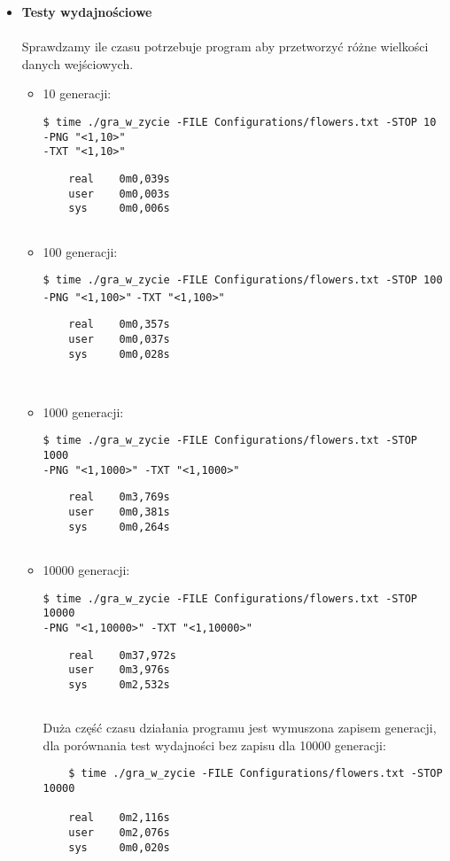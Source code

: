 \documentclass[12pt,a4paper,notitlepage]{report}
\begin{document}
\begin{itemize}
{\begin{verbatim}
\end{verbatim}}

\item\large\textbf {Testy wydajnościowe}\\
\\
Sprawdzamy ile czasu potrzebuje program aby przetworzyć różne wielkości danych wejściowych.
\begin{itemize}
	\item 10 generacji:
	
	\small\verb|$ time ./gra_w_zycie -FILE Configurations/flowers.txt -STOP 10 -PNG "<1,10>"|\\
	\verb|-TXT "<1,10>"|
	\begin{verbatim}
	real    0m0,039s
	user    0m0,003s
	sys     0m0,006s
	
	\end{verbatim}
	
	\large\item 100 generacji:
	
	\small\verb|$ time ./gra_w_zycie -FILE Configurations/flowers.txt -STOP 100 -PNG "<1,100>"|
	\verb|-TXT "<1,100>"|
	\begin{verbatim}
	real    0m0,357s
	user    0m0,037s
	sys     0m0,028s
	
	
	\end{verbatim}
	
	\large\item 1000 generacji:
	
	\small\verb|$ time ./gra_w_zycie -FILE Configurations/flowers.txt -STOP 1000|\\
	\verb|-PNG "<1,1000>" -TXT "<1,1000>"|
	\begin{verbatim}
	real    0m3,769s
	user    0m0,381s
	sys     0m0,264s
	
	\end{verbatim}
	
	\large\item 10000 generacji:
	
	\small\verb|$ time ./gra_w_zycie -FILE Configurations/flowers.txt -STOP 10000|\\
	\verb|-PNG "<1,10000>" -TXT "<1,10000>"|
	\begin{verbatim}
	real    0m37,972s
	user    0m3,976s
	sys     0m2,532s
	
	\end{verbatim}
	
	\large Duża część czasu działania programu jest wymuszona zapisem generacji, dla porównania test wydajności bez zapisu dla 10000 generacji:
	\small\begin{verbatim}
	$ time ./gra_w_zycie -FILE Configurations/flowers.txt -STOP 10000

	real    0m2,116s
	user    0m2,076s
	sys     0m0,020s
	\end{verbatim}
	
	
\end{itemize}
	
\end{itemize}
\end{document}
